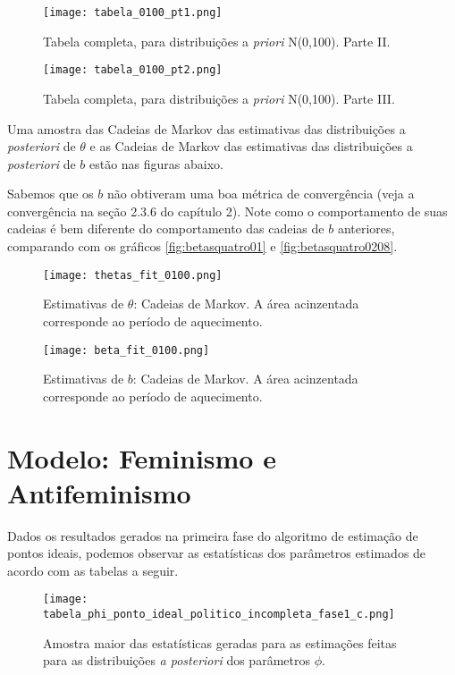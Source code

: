 \documentclass[
	12pt,				%
	openright,			%
	twoside,			%
	a4paper,			%
	english,			%
	brazil				%
	]{abntex2}
\begin{document}
\begin{anexosenv}
 \begin{figure}[!htbp]
    \centering
    \texttt{[image: tabela\_0100\_pt1.png]}
    \caption{Tabela completa, para distribuições a \textit{priori} N(0,100). Parte II.}
    \label{fig:tabelacompleta01002}
 \end{figure}
 
 \begin{figure}[!htbp]
    \centering
    \texttt{[image: tabela\_0100\_pt2.png]}
    \caption{Tabela completa, para distribuições a \textit{priori} N(0,100). Parte III.}
    \label{fig:tabelacompleta01002}
 \end{figure}
 
 Uma amostra das Cadeias de Markov das estimativas das distribuições a \textit{posteriori} de $\theta$ e as Cadeias de Markov das estimativas das distribuições a \textit{posteriori} de $b$ estão nas figuras abaixo.
 
 Sabemos que os $b$ não obtiveram uma boa métrica de convergência (veja a convergência na seção 2.3.6 do capítulo 2). Note como o comportamento de suas cadeias é bem diferente do comportamento das cadeias de $b$ anteriores, comparando com os gráficos \ref{fig:betasquatro01} e \ref{fig:betasquatro0208}.
 
 \begin{figure}[!htbp]
    \centering
    \texttt{[image: thetas\_fit\_0100.png]}
    \caption{Estimativas de $\theta$: Cadeias de Markov. A área acinzentada corresponde ao período de aquecimento.}
    \label{fig:thetasquatro0100}
 \end{figure}
 
 \begin{figure}[!htbp]
    \centering
    \texttt{[image: beta\_fit\_0100.png]}
    \caption{Estimativas de $b$: Cadeias de Markov. A área acinzentada corresponde ao período de aquecimento.}
    \label{fig:betasquatro0100}
 \end{figure}
 
 \newpage
 
 \section{Modelo: Feminismo e Antifeminismo}\label{resultadomodeloextra}
 Dados os resultados gerados na primeira fase do algoritmo de estimação de pontos ideais, podemos observar as estatísticas dos parâmetros estimados de acordo com as tabelas a seguir.
 
  \begin{figure}[!htbp]
    \centering
    \texttt{[image: tabela\_phi\_ponto\_ideal\_politico\_incompleta\_fase1\_c.png]}
    \caption{Amostra maior das estatísticas geradas para as estimações feitas para as distribuições \textit{a posteriori} dos parâmetros $\phi$.}
    \label{convphianexo}
 \end{figure}
 

\end{anexosenv}
\end{document}
